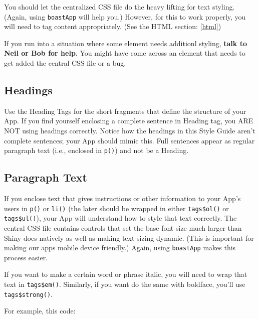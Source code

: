 \documentclass[]{book}
\newenvironment{Shaded}{\begin{snugshade}}{\end{snugshade}}
\newcommand{\KeywordTok}[1]{\textcolor[rgb]{0.13,0.29,0.53}{\textbf{#1}}}
\newcommand{\NormalTok}[1]{#1}
\newcommand{\OperatorTok}[1]{\textcolor[rgb]{0.81,0.36,0.00}{\textbf{#1}}}
\newcommand{\StringTok}[1]{\textcolor[rgb]{0.31,0.60,0.02}{#1}}
\begin{document}
You should let the centralized CSS file do the heavy lifting for text styling. (Again, using \texttt{boastApp} will help you.) However, for this to work properly, you will need to tag content appropriately. (See the HTML section: \ref{html})

If you run into a situation where some element needs additionl styling, \textbf{talk to Neil or Bob for help}. You might have come across an element that needs to get added the central CSS file or a bug.

\hypertarget{headings}{%
\subsection{Headings}\label{headings}}

Use the Heading Tags for the short fragments that define the structure of your App. If you find yourself enclosing a complete sentence in Heading tag, you ARE NOT using headings correctly. Notice how the headings in this Style Guide aren't complete sentences; your App should mimic this. Full sentences appear as regular paragraph text (i.e., enclosed in \texttt{p()}) and not be a Heading.

\hypertarget{paragraph-text}{%
\subsection{Paragraph Text}\label{paragraph-text}}

If you enclose text that gives instructions or other information to your App's users in \texttt{p()} or \texttt{li()} (the later should be wrapped in either \texttt{tags\$ol()} or \texttt{tags\$ul()}), your App will understand how to style that text correctly. The central CSS file contains controls that set the base font size much larger than Shiny does natively as well as making text sizing dynamic. (This is important for making our apps mobile device friendly.) Again, using \texttt{boastApp} makes this process easier.

If you want to make a certain word or phrase italic, you will need to wrap that text in \texttt{tags\$em()}. Similarly, if you want do the same with boldface, you'll use \texttt{tags\$strong()}.

For example, this code:

\begin{Shaded}
\end{Shaded}
\end{document}
